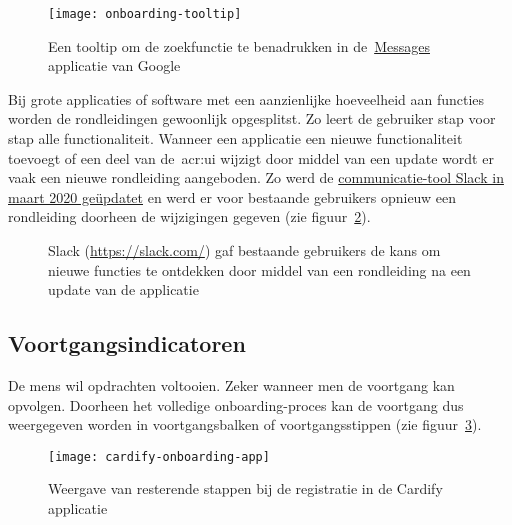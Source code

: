 \begin{figure}[h!]
    \centering
    \texttt{[image: onboarding-tooltip]}
    \caption[Voorbeeld tooltip]{Een tooltip om de zoekfunctie te benadrukken in de~\href{https://messages.google.com/}{Messages} applicatie van Google}
    \label{fig:onboarding:rondleiding}
\end{figure}

Bij grote applicaties of software met een aanzienlijke hoeveelheid aan functies worden de rondleidingen gewoonlijk opgesplitst. Zo leert de gebruiker stap voor stap alle functionaliteit. Wanneer een applicatie een nieuwe functionaliteit toevoegt of een deel van de~\acrshort{acr:ui} wijzigt door middel van een update wordt er vaak een nieuwe rondleiding aangeboden. Zo werd de \href{https://www.theverge.com/2020/3/18/21184865/slack-redesign-update-sidebar-changes-available-now-download}{communicatie-tool Slack in maart 2020 geüpdatet} en werd er voor bestaande gebruikers opnieuw een rondleiding doorheen de wijzigingen gegeven (zie figuur~\ref{fig:onboarding:rondleiding-slack}).

\begin{figure}[h!]
    \centering
    \qquad
    \caption[Voorbeeld rondleiding Slack]{Slack (\url{https://slack.com/}) gaf bestaande gebruikers de kans om nieuwe functies te ontdekken door middel van een rondleiding na een update van de applicatie}
    \label{fig:onboarding:rondleiding-slack}
\end{figure}

\subsection{Voortgangsindicatoren}
\label{sec:onboarding:voortgang}

De mens wil opdrachten voltooien. Zeker wanneer men de voortgang kan opvolgen. Doorheen het volledige onboarding-proces kan de voortgang dus weergegeven worden in voortgangsbalken of voortgangsstippen (zie figuur~\ref{fig:onboarding:voortgang}).

\begin{figure}[h!]
    \centering
    \texttt{[image: cardify-onboarding-app]}
    \caption[Voorbeeld voortgangsindicatoren]{Weergave van resterende stappen bij de registratie in de Cardify applicatie}
    \label{fig:onboarding:voortgang}
\end{figure}

